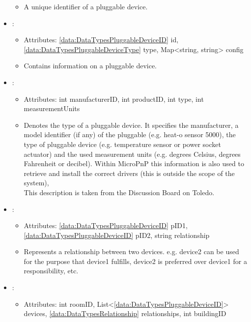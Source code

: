 \begin{itemize}[nolistsep,noitemsep]
\begin{itemize}[noitemsep,nolistsep]
\item[] A unique identifier of a pluggable device.
\end{itemize}
\item {}: 
\begin{itemize}[noitemsep,nolistsep]
\item[] Attributes: \ref{data:DataTypesPluggableDeviceID} id, \ref{data:DataTypesPluggableDeviceType} type, Map\textless{}string, string\textgreater{} config
\item[] Contains information on a pluggable device.
\end{itemize}
\item {}: 
\begin{itemize}[noitemsep,nolistsep]
\item[] Attributes: int manufacturerID, int productID, int type, int measurementUnits
\item[] Denotes the type of a pluggable device. It specifies the manufacturer, a model identifier (if any) of the pluggable (e.g. heat-o sensor 5000), the type of pluggable device (e.g. temperature sensor or power socket actuator) and the used measurement units (e.g. degrees Celsius, degrees Fahrenheit or decibel). Within MicroPnP this information is also used to retrieve and install the correct drivers (this is outside the scope of the system), \\
This description is taken from the Discussion Board on Toledo.
\end{itemize}
\item {}: 
\begin{itemize}[noitemsep,nolistsep]
\item[] Attributes: \ref{data:DataTypesPluggableDeviceID} pID1, \ref{data:DataTypesPluggableDeviceID} pID2, string relationship
\item[] Represents a relationship between two devices. e.g. device2 can be used for the purpose that device1 fulfills, device2 is preferred over device1 for a responsibility, etc.
\end{itemize}
\item {}: 
\begin{itemize}[noitemsep,nolistsep]
\item[] Attributes: int roomID, List\textless{}\ref{data:DataTypesPluggableDeviceID}\textgreater{} devices, \ref{data:DataTypesRelationship} relationships, int buildingID

\end{itemize}
\end{itemize}
